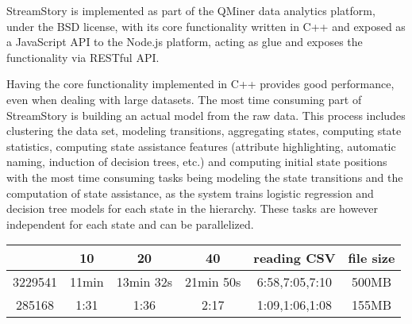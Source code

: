StreamStory is implemented as part of the QMiner \cite{qminer} data analytics platform,
under the BSD license, with its core functionality written in C++ and exposed as a 
JavaScript API to the Node.js platform, acting as glue and exposes the functionality
via RESTful API.

Having the core functionality implemented in C++ provides good performance, even when
dealing with large datasets. The most time consuming part of StreamStory is building
an actual model from the raw data. This process includes clustering the data set,
modeling transitions, aggregating states, computing state statistics, computing state assistance
features (attribute highlighting, automatic naming, induction of decision trees, etc.) and
computing initial state positions with the most time consuming tasks being modeling the state
transitions and the computation of state assistance, as the system trains logistic regression
and decision tree models for each state in the hierarchy. These tasks are however independent
for each state and can be parallelized.

\begin{tabular}{ c | c c c c c}
	\label{tab:time-tests}
	 & 10 & 20 & 40 & reading CSV & file size \\
	\hline
	3229541 & 11min & 13min 32s & 21min 50s & 6:58,7:05,7:10 & 500MB \\
	285168 & 1:31 & 1:36 & 2:17 & 1:09,1:06,1:08 & 155MB
\end{tabular}